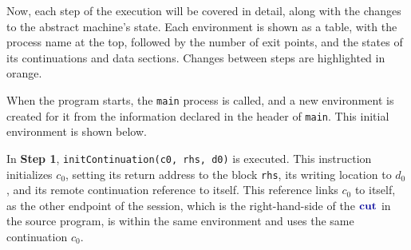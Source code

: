 Now, each step of the execution will be covered in detail, along with the changes to the abstract machine's state. Each environment is shown as a table, with the process name at the top, followed by the number of exit points, and the states of its continuations and data sections. Changes between steps are highlighted in orange.

When the program starts, the \texttt{main} process is called, and a new environment is created for it from the information declared in the header of \texttt{main}. This initial environment is shown below.

\begin{center}
    \begin{minipage}{0.49\textwidth}
        \centering
    \end{minipage}
    \hfill
    \begin{minipage}{0.49\textwidth}
        \centering
    \end{minipage}
\end{center}

In \textbf{Step 1}, \texttt{initContinuation(c0, rhs, d0)} is executed. This instruction initializes $c_0$, setting its return address to the block \texttt{rhs}, its writing location to $d_0$, and its remote continuation reference to itself. This reference links $c_0$ to itself, as the other endpoint of the session, which is the right-hand-side of the $\cutp$ in the source program, is within the same environment and uses the same continuation $c_0$.

